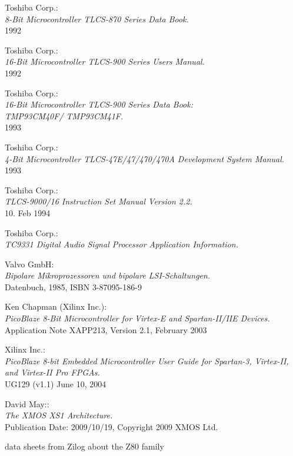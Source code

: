  Toshiba Corp.: \\
		{\em 8-Bit Microcontroller TLCS-870 Series Data Book.\/} \\
		1992

 Toshiba Corp.: \\
		{\em 16-Bit Microcontroller TLCS-900 Series Users Manual.\/} \\
		1992

 Toshiba Corp.: \\
		{\em 16-Bit Microcontroller TLCS-900 Series Data Book: \\
		TMP93CM40F/ TMP93CM41F.\/} \\
		1993

 Toshiba Corp.: \\
		{\em 4-Bit Microcontroller TLCS-47E/47/470/470A Development
		System Manual.\/} \\
		1993

 Toshiba Corp.: \\
		{\em TLCS-9000/16 Instruction Set Manual Version 2.2.\/} \\
		10. Feb 1994

 Toshiba Corp.: \\
		{\em TC9331 Digital Audio Signal Processor
		Application Information.}

 Valvo GmbH: \\
		{\em Bipolare Mikroprozessoren und bipolare
		LSI-Schaltungen.\/} \\
		Datenbuch, 1985, ISBN 3-87095-186-9

 Ken Chapman (Xilinx Inc.):\\
		{\em PicoBlaze 8-Bit Microcontroller for Virtex-E
		and Spartan-II/IIE Devices.\/} \\
		Application Note XAPP213, Version 2.1, February 2003

 Xilinx Inc.: \\
		{\em PicoBlaze 8-bit Embedded Microcontroller User Guide
		for Spartan-3, Virtex-II, and Virtex-II Pro FPGAs.\/} \\
		UG129 (v1.1) June 10, 2004

 David May:: \\
		{\em The XMOS XS1 Architecture.\/} \\
		Publication Date: 2009/10/19, Copyright 2009 XMOS Ltd.

 data sheets from Zilog about the Z80 family

